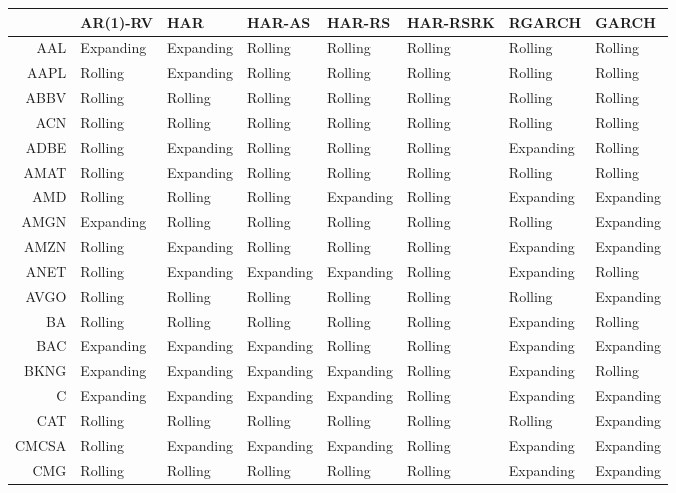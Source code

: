 \begin{table}[ht]
\centering
\begin{tabular}{rlllllll}
  \hline
 & AR(1)-RV & HAR & HAR-AS & HAR-RS & HAR-RSRK & RGARCH & GARCH \\ 
  \hline
AAL & Expanding & Expanding & Rolling & Rolling & Rolling & Rolling & Rolling \\ 
  AAPL & Rolling & Expanding & Rolling & Rolling & Rolling & Rolling & Rolling \\ 
  ABBV & Rolling & Rolling & Rolling & Rolling & Rolling & Rolling & Rolling \\ 
  ACN & Rolling & Rolling & Rolling & Rolling & Rolling & Rolling & Rolling \\ 
  ADBE & Rolling & Expanding & Rolling & Rolling & Rolling & Expanding & Rolling \\ 
  AMAT & Rolling & Expanding & Rolling & Rolling & Rolling & Rolling & Rolling \\ 
  AMD & Rolling & Rolling & Rolling & Expanding & Rolling & Expanding & Expanding \\ 
  AMGN & Expanding & Rolling & Rolling & Rolling & Rolling & Rolling & Expanding \\ 
  AMZN & Rolling & Expanding & Rolling & Rolling & Rolling & Expanding & Expanding \\ 
  ANET & Rolling & Expanding & Expanding & Expanding & Rolling & Expanding & Rolling \\ 
  AVGO & Rolling & Rolling & Rolling & Rolling & Rolling & Rolling & Expanding \\ 
  BA & Rolling & Rolling & Rolling & Rolling & Rolling & Expanding & Rolling \\ 
  BAC & Expanding & Expanding & Expanding & Rolling & Rolling & Expanding & Expanding \\ 
  BKNG & Expanding & Expanding & Expanding & Expanding & Rolling & Expanding & Rolling \\ 
  C & Expanding & Expanding & Expanding & Expanding & Rolling & Expanding & Expanding \\ 
  CAT & Rolling & Rolling & Rolling & Rolling & Rolling & Rolling & Expanding \\ 
  CMCSA & Rolling & Expanding & Expanding & Expanding & Rolling & Expanding & Expanding \\ 
  CMG & Rolling & Rolling & Rolling & Rolling & Rolling & Expanding & Expanding \\ 

\end{tabular}
\end{table}
